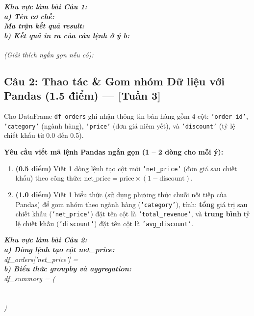 \documentclass[11pt,a4paper]{article}
\newcommand{\answerbox}[2]{
  \vspace{1mm}
  \begin{tcolorbox}[
    colback=white,
    colframe=gray!60,
    boxrule=0.6pt,
    arc=2pt,
    height=#1,
    left=3mm, right=3mm, top=2mm, bottom=2mm
  ]
  \small\textit{\color{gray}#2}
  \end{tcolorbox}
  \vspace{1mm}
}
\begin{document}
\answerbox{12.0cm}{
\textbf{Khu vực làm bài Câu 1:}\\[3mm]
\textbf{a) Tên cơ chế:} \dotfill\\[4mm]
\textbf{Ma trận kết quả result:}\\[28mm]
\textbf{b) Kết quả in ra của câu lệnh ở ý b:}\\
\dotfill\\[4mm]
\textit{(Giải thích ngắn gọn nếu có):} \dotfill
}

\newpage
\subsection*{Câu 2: Thao tác \& Gom nhóm Dữ liệu với Pandas (1.5 điểm) --- [Tuần 3]}
Cho DataFrame \texttt{df\_orders} ghi nhận thông tin bán hàng gồm 4 cột: \texttt{'order\_id'}, \texttt{'category'} (ngành hàng), \texttt{'price'} (đơn giá niêm yết), và \texttt{'discount'} (tỷ lệ chiết khấu từ 0.0 đến 0.5).

\noindent
\textbf{Yêu cầu viết mã lệnh Pandas ngắn gọn (1 -- 2 dòng cho mỗi ý):}
\begin{enumerate}[label=\textbf{\alph*)}]
  \item \textbf{(0.5 điểm)} Viết 1 dòng lệnh tạo cột mới \texttt{'net\_price'} (đơn giá sau chiết khấu) theo công thức: $\text{net\_price} = \text{price} \times (1 - \text{discount})$.
  \item \textbf{(1.0 điểm)} Viết 1 biểu thức (sử dụng phương thức chuỗi nối tiếp của Pandas) để gom nhóm theo ngành hàng (\texttt{'category'}), tính: \textbf{tổng} giá trị sau chiết khấu (\texttt{'net\_price'}) đặt tên cột là \texttt{'total\_revenue'}, và \textbf{trung bình} tỷ lệ chiết khấu (\texttt{'discount'}) đặt tên cột là \texttt{'avg\_discount'}.
\end{enumerate}

\answerbox{14.0cm}{
\textbf{Khu vực làm bài Câu 2:}\\[3mm]
\textbf{a) Dòng lệnh tạo cột net\_price:}\\
df\_orders['net\_price'] = \dotfill\\[6mm]
\textbf{b) Biểu thức groupby và aggregation:}\\
df\_summary = (\dotfill\\[5mm]
\hspace*{3.0cm}\dotfill\\[5mm]
\hspace*{3.0cm}\dotfill\\[5mm]
\hspace*{3.0cm}\dotfill)\\[4mm]
\dotfill
}
\end{document}
